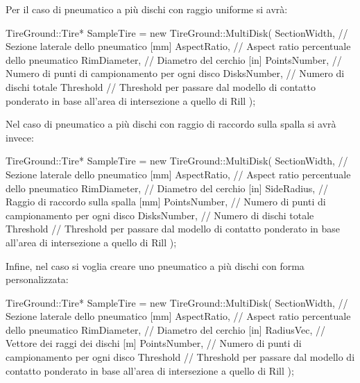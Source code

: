 Per il caso di pneumatico a più dischi con raggio uniforme si avrà:
\begin{pseudoc}
	TireGround::Tire* SampleTire = new TireGround::MultiDisk(
		SectionWidth, // Sezione laterale dello pneumatico [mm]
		AspectRatio,  // Aspect ratio percentuale dello pneumatico
		RimDiameter,  // Diametro del cerchio [in]
		PointsNumber, // Numero di punti di campionamento per ogni disco
		DisksNumber,  // Numero di dischi totale
		Threshold     // Threshold per passare dal modello di contatto ponderato in base all'area di intersezione a quello di Rill 
		);
\end{pseudoc}
Nel caso di pneumatico a più dischi con raggio di raccordo sulla spalla si avrà invece:
\begin{pseudoc}
	TireGround::Tire* SampleTire = new TireGround::MultiDisk(
		SectionWidth, // Sezione laterale dello pneumatico [mm]
		AspectRatio,  // Aspect ratio percentuale dello pneumatico
		RimDiameter,  // Diametro del cerchio [in]
		SideRadius,   // Raggio di raccordo sulla spalla [mm]
		PointsNumber, // Numero di punti di campionamento per ogni disco
		DisksNumber,  // Numero di dischi totale
		Threshold     // Threshold per passare dal modello di contatto ponderato in base all'area di intersezione a quello di Rill 
		);
\end{pseudoc}
Infine, nel caso si voglia creare uno pneumatico a più dischi con forma personalizzata:
\begin{pseudoc}
	TireGround::Tire* SampleTire = new TireGround::MultiDisk(
		SectionWidth, // Sezione laterale dello pneumatico [mm]
		AspectRatio,  // Aspect ratio percentuale dello pneumatico
		RimDiameter,  // Diametro del cerchio [in]
		RadiusVec,    // Vettore dei raggi dei dischi [m]
		PointsNumber, // Numero di punti di campionamento per ogni disco
		Threshold     // Threshold per passare dal modello di contatto ponderato in base all'area di intersezione a quello di Rill 
		);
\end{pseudoc}
%
